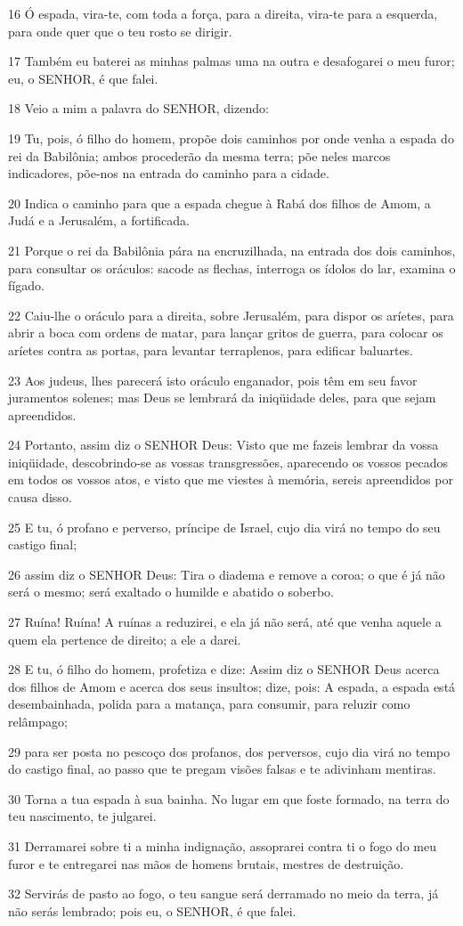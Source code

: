 \par 16 Ó espada, vira-te, com toda a força, para a direita, vira-te para a esquerda, para onde quer que o teu rosto se dirigir.
\par 17 Também eu baterei as minhas palmas uma na outra e desafogarei o meu furor; eu, o SENHOR, é que falei.
\par 18 Veio a mim a palavra do SENHOR, dizendo:
\par 19 Tu, pois, ó filho do homem, propõe dois caminhos por onde venha a espada do rei da Babilônia; ambos procederão da mesma terra; põe neles marcos indicadores, põe-nos na entrada do caminho para a cidade.
\par 20 Indica o caminho para que a espada chegue à Rabá dos filhos de Amom, a Judá e a Jerusalém, a fortificada.
\par 21 Porque o rei da Babilônia pára na encruzilhada, na entrada dos dois caminhos, para consultar os oráculos: sacode as flechas, interroga os ídolos do lar, examina o fígado.
\par 22 Caiu-lhe o oráculo para a direita, sobre Jerusalém, para dispor os aríetes, para abrir a boca com ordens de matar, para lançar gritos de guerra, para colocar os aríetes contra as portas, para levantar terraplenos, para edificar baluartes.
\par 23 Aos judeus, lhes parecerá isto oráculo enganador, pois têm em seu favor juramentos solenes; mas Deus se lembrará da iniqüidade deles, para que sejam apreendidos.
\par 24 Portanto, assim diz o SENHOR Deus: Visto que me fazeis lembrar da vossa iniqüidade, descobrindo-se as vossas transgressões, aparecendo os vossos pecados em todos os vossos atos, e visto que me viestes à memória, sereis apreendidos por causa disso.
\par 25 E tu, ó profano e perverso, príncipe de Israel, cujo dia virá no tempo do seu castigo final;
\par 26 assim diz o SENHOR Deus: Tira o diadema e remove a coroa; o que é já não será o mesmo; será exaltado o humilde e abatido o soberbo.
\par 27 Ruína! Ruína! A ruínas a reduzirei, e ela já não será, até que venha aquele a quem ela pertence de direito; a ele a darei.
\par 28 E tu, ó filho do homem, profetiza e dize: Assim diz o SENHOR Deus acerca dos filhos de Amom e acerca dos seus insultos; dize, pois: A espada, a espada está desembainhada, polida para a matança, para consumir, para reluzir como relâmpago;
\par 29 para ser posta no pescoço dos profanos, dos perversos, cujo dia virá no tempo do castigo final, ao passo que te pregam visões falsas e te adivinham mentiras.
\par 30 Torna a tua espada à sua bainha. No lugar em que foste formado, na terra do teu nascimento, te julgarei.
\par 31 Derramarei sobre ti a minha indignação, assoprarei contra ti o fogo do meu furor e te entregarei nas mãos de homens brutais, mestres de destruição.
\par 32 Servirás de pasto ao fogo, o teu sangue será derramado no meio da terra, já não serás lembrado; pois eu, o SENHOR, é que falei.

